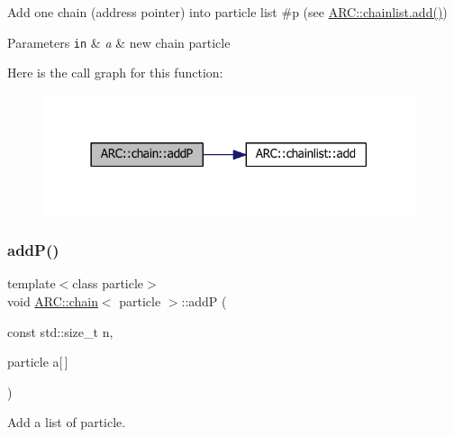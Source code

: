 Add one chain (address pointer) into particle list \#p (see \hyperlink{classARC_1_1chainlist_afa780edfa301cc22cf189e63d7a59c2c}{A\+R\+C\+::chainlist.\+add()}) 
\begin{DoxyParams}[1]{Parameters}
\mbox{\tt in}  & {\em a} & new chain particle \\
\hline
\end{DoxyParams}
Here is the call graph for this function\+:
\nopagebreak
\begin{figure}[H]
\begin{center}
\leavevmode
\includegraphics[width=309pt]{classARC_1_1chain_a22a0c3e8b42954edee0d2f66a27e8640_cgraph}
\end{center}
\end{figure}
\hypertarget{classARC_1_1chain_a658a7b777ac45e7900990dcc6ef0b752}{}\label{classARC_1_1chain_a658a7b777ac45e7900990dcc6ef0b752} 
\subsubsection{\texorpdfstring{add\+P()}{addP()}\hspace{0.1cm}{\footnotesize\ttfamily [3/3]}}
{\footnotesize\ttfamily template$<$class particle$>$ \\
void \hyperlink{classARC_1_1chain}{A\+R\+C\+::chain}$<$ particle $>$\+::addP (\begin{DoxyParamCaption}\item[{const std\+::size\+\_\+t}]{n,  }\item[{particle}]{a\mbox{[}$\,$\mbox{]} }\end{DoxyParamCaption})\hspace{0.3cm}{\ttfamily [inline]}}



Add a list of particle. 

